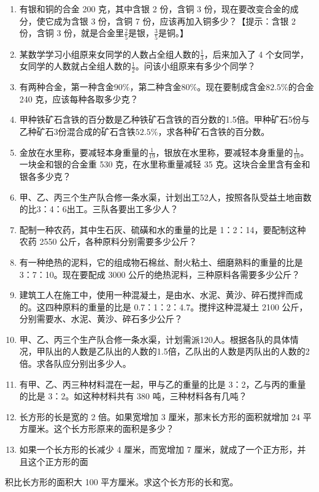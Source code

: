 \begin{enumerate}
\item
  有银和铜的合金 200 克，其中含银 2 份，含铜 3
  份，现在要改变合金的成分，使它成为含银 3 份，含铜 7
  份，应该再加入铜多少？【提示：含银 2 份，含铜 3
  份，就是合金里\(\frac{2}{5}\)是银，\(\frac{3}{5}\)是铜。】
\item
  某数学学习小组原来女同学的人数占全组人数的\(\frac{1}{3}\)，后来加入了
  4
  个女同学，女同学的人数就占全组人数的\(\frac{1}{2}\)。问该小组原来有多少个同学？
\item
  有两种合金，第一种含金\(90\%\)，第二种含金\(80\%\)。现在要制成含金\(82.5\%\)的合金
  240 克，应该每种各取多少克？
\item
  甲种铁矿石含铁的百分数是乙种铁矿石含铁的百分数的1.5倍。甲种矿石5份与乙种矿石3份混合成的矿石含铁\(52.5\%\)，求各种矿石含铁的百分数。
\item
  金放在水里称，要减轻本身重量的\(\frac{1}{19}\)，银放在水里称，要减轻本身重量的\(\frac{1}{10}\)。一块金和银的合金重
  530 克，在水里称重量减轻 35 克。这块合金里含有金和银各多少克？
\item
  甲、乙、丙三个生产队合修一条水渠，计划出工52人，按照各队受益土地亩数的比3：4：6出工。三队各要出工多少人？
\item
  配制一种农药，其中生石灰、硫磺和水的重量的比是
  1：2：14，要配制这种农药 2550 公斤，各种原料分别需要多少公斤？
\item
  有一种绝热的泥料，它的组成物石棉丝、耐火粘土、细磨熟料的重量的比是
  3：7：10。现在要配成 3000 公斤的绝热泥料，三种原料各需要多少公斤？
\item
  建筑工人在施工中，使用一种混凝土，是由水、水泥、黄沙、碎石搅拌而成的。这四种原料的重量的比是
  0.7：1：2：4.7。搅拌这种混凝土 2100
  公斤，分别需要水、水泥、黄沙、碎石多少公斤？
\item
  甲、乙、丙三个生产队合修一条水渠，计划需派120人。根据各队的具体情况，甲队出的人数是乙队出的人数的1.5倍，乙队出的人数是丙队出的人数的2倍。求各队应分别出多少人。
\item
  有甲、乙、丙三种材料混在一起，甲与乙的重量的比是
  3：2，乙与丙的重量的比是 3：2。如这种材料共有 380
  吨，三种材料各有几吨？
\item
  长方形的长是宽的 2 倍。如果宽增加 3 厘米，那末长方形的面积就增加 24
  平方厘米。这个长方形原来的面积是多少？
\item
  如果一个长方形的长减少 4 厘米，而宽增加 7
  厘米，就成了一个正方形，并且这个正方形的面
\end{enumerate}

积比长方形的面积大 100 平方厘米。求这个长方形的长和宽。

